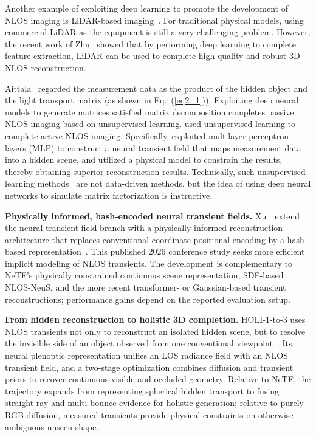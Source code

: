 Another example of exploiting deep learning to promote the development of NLOS imaging is LiDAR-based imaging~\cite{zhuFastNonlineofsightImaging2021a}.
For traditional physical models, using commercial LiDAR as the equipment is still a very challenging problem. However, the recent work of Zhu \etal~showed that by performing deep learning to complete feature extraction, LiDAR can be used to complete high-quality and robust 3D NLOS reconstruction\cite{zhuFastNonlineofsightImaging2021a}.

Aittala \etal~regarded the measurement data as the product of the hidden object and the light transport matrix\cite{aittalaComputationalMirrorsBlind2019} (as shown in Eq.~(\ref{eq2_1})). Exploiting deep neural models to generate matrices satisfied matrix decomposition completes passive NLOS imaging based on unsupervised learning.
\cite{shenNonlineofsightImagingNeural2021} used unsupervised learning to complete active NLOS imaging. Specifically, \cite{shenNonlineofsightImagingNeural2021} exploited multilayer perceptron layers (MLP) to construct a neural transient field that maps measurement data into a hidden scene, and utilized a physical model to constrain the results, thereby obtaining superior reconstruction results.
Technically, such unsupervised learning methods~\cite{aittalaComputationalMirrorsBlind2019,shenNonlineofsightImagingNeural2021} are not data-driven methods, but the idea of using deep neural networks to simulate matrix factorization is instructive.

\vspace{0.8mm}
\noindent \textbf{Physically informed, hash-encoded neural transient fields.}
Xu~\etal~extend the neural transient-field branch with a physically informed reconstruction architecture that replaces conventional coordinate positional encoding by a hash-based representation~\cite{xuPhysicallyInformedNeuralTransient2026}. This published 2026 conference study seeks more efficient implicit modeling of NLOS transients. The development is complementary to NeTF's physically constrained continuous scene representation, SDF-based NLOS-NeuS, and the more recent transformer- or Gaussian-based transient reconstructions; performance gains depend on the reported evaluation setup.

\vspace{0.8mm}
\noindent \textbf{From hidden reconstruction to holistic 3D completion.}
HOLI-1-to-3 uses NLOS transients not only to reconstruct an isolated hidden scene, but to resolve the invisible side of an object observed from one conventional viewpoint~\cite{shenHOLI1to3TPAMI2025}. Its neural plenoptic representation unifies an LOS radiance field with an NLOS transient field, and a two-stage optimization combines diffusion and transient priors to recover continuous visible and occluded geometry. Relative to NeTF, the trajectory expands from representing spherical hidden transport to fusing straight-ray and multi-bounce evidence for holistic generation; relative to purely RGB diffusion, measured transients provide physical constraints on otherwise ambiguous unseen shape.

